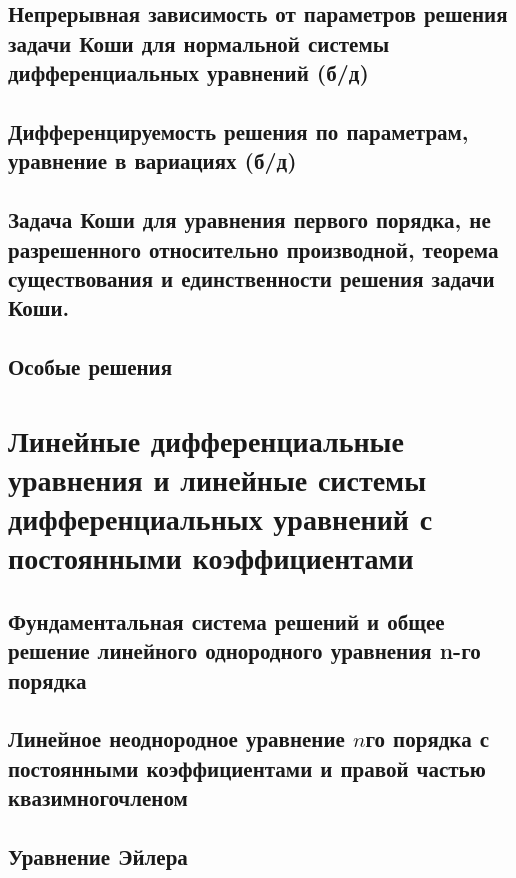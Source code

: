 \subsection{Непрерывная зависимость от параметров решения задачи Коши для нормальной системы дифференциальных уравнений (б/д)}

\bigbreak
\bigbreak
\subsection{Дифференцируемость решения по параметрам, уравнение в вариациях (б/д)}

\newpage

\subsection{Задача Коши для уравнения первого порядка, не разрешенного относительно производной, теорема существования и единственности решения задачи Коши.}
\label{zk-notsolved}


\subsection{Особые решения}

\newpage

\section{Линейные дифференциальные уравнения и линейные системы дифференциальных уравнений с постоянными коэффициентами}

\subsection{Фундаментальная система решений и общее решение линейного однородного уравнения n-го порядка}
\label{firstthird-anchor}


\newpage

\subsection{Линейное неоднородное уравнение \texorpdfstring{$n$}-го порядка с постоянными коэффициентами и правой частью квазимногочленом}

\newpage

\subsection{Уравнение Эйлера}

\newpage

